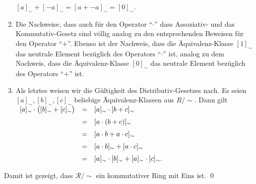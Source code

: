 \begin{enumerate}
      \hspace*{1.3cm}
      $[a]_\sim + [-a]_\sim = [a + -a]_\sim = [0]_\sim$.
\item Die Nachweise, dass auch für den  Operator ``$\cdot$'' dass Assoziativ- und das Kommutativ-Gesetz 
      sind völlig analog zu den entsprechenden Beweisen für den Operator ``$+$''.
      Ebenso ist der Nachweis, dass die Äquivalenz-Klasse $[1]_\sim$ das neutrale Element bezüglich des Operators 
      ``$\cdot$'' ist, analog zu dem Nachweis, dass die Äquivalenz-Klasse $[0]_\sim$ das neutrale Element
      bezüglich des Operators ``$+$'' ist.
\item Als letztes weisen wir die Gültigkeit des Distributiv-Gesetzes nach.
      Es seien  $[a]_\sim, [b]_\sim, [c]_\sim$ beliebige Äquivalenz-Klassen aus $R/\!\sim$. Dann gilt
      \\[0.2cm]
      \hspace*{1.3cm}
      $
      \begin{array}[t]{lcl}
            [a]_\sim \cdot \bigl([b]_\sim + [c]_\sim\bigr) 
      & = & [a]_\sim \cdot [b + c]_\sim                        \\[0.2cm]
      & = & [a \cdot (b + c)]_\sim                             \\[0.2cm]
      & = & [a \cdot b + a \cdot c]_\sim                       \\[0.2cm]
      & = & [a \cdot b]_\sim + [a \cdot c]_\sim                \\[0.2cm]
      & = & [a]_\sim \cdot [b]_\sim + [a]_\sim \cdot [c]_\sim. 
      \end{array}
      $
\end{enumerate}
Damit ist gezeigt, dass $\mathcal{R}/\!\sim$ ein kommutativer Ring mit Eins ist. \qed

